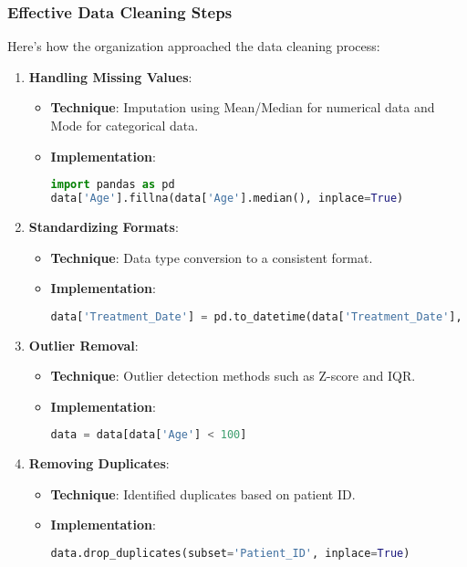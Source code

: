 \documentclass[aspectratio=169]{beamer}
\begin{document}
\begin{frame}[fragile]
    \frametitle{Effective Data Cleaning Steps}
    Here’s how the organization approached the data cleaning process:
    \begin{enumerate}
        \item \textbf{Handling Missing Values}:
        \begin{itemize}
            \item \textbf{Technique}: Imputation using Mean/Median for numerical data and Mode for categorical data.
            \item \textbf{Implementation}:
            \begin{lstlisting}[language=Python]
import pandas as pd
data['Age'].fillna(data['Age'].median(), inplace=True)
            \end{lstlisting}
        \end{itemize}

        \item \textbf{Standardizing Formats}:
        \begin{itemize}
            \item \textbf{Technique}: Data type conversion to a consistent format.
            \item \textbf{Implementation}:
            \begin{lstlisting}[language=Python]
data['Treatment_Date'] = pd.to_datetime(data['Treatment_Date'], errors='coerce')
            \end{lstlisting}
        \end{itemize}

        \item \textbf{Outlier Removal}:
        \begin{itemize}
            \item \textbf{Technique}: Outlier detection methods such as Z-score and IQR.
            \item \textbf{Implementation}:
            \begin{lstlisting}[language=Python]
data = data[data['Age'] < 100]
            \end{lstlisting}
        \end{itemize}

        \item \textbf{Removing Duplicates}:
        \begin{itemize}
            \item \textbf{Technique}: Identified duplicates based on patient ID.
            \item \textbf{Implementation}:
            \begin{lstlisting}[language=Python]
data.drop_duplicates(subset='Patient_ID', inplace=True)
            \end{lstlisting}
        \end{itemize}
    \end{enumerate}
\end{frame}
\end{document}
